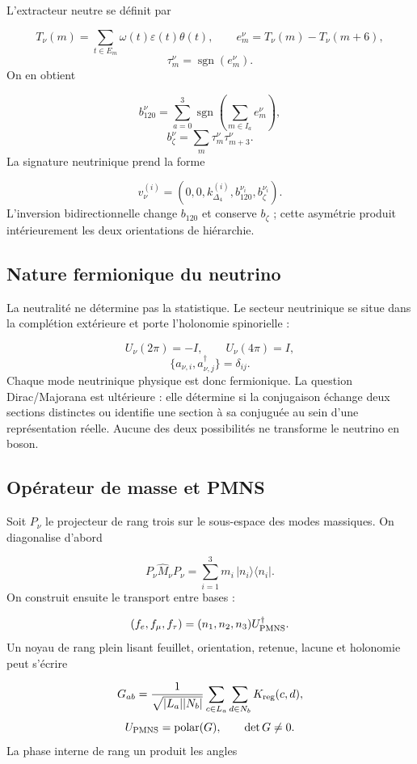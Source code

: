 L'extracteur neutre se définit par

\[
 T_\nu(m)=\sum_{t\in E_m}
 \omega(t)\varepsilon(t)\theta(t),
\qquad
 e_m^\nu=T_\nu(m)-T_\nu(m+6),
\]
\[
 \tau_m^\nu=\operatorname{sgn}(e_m^\nu).
\]
On en obtient

\[
 b_{120}^\nu
 =\sum_{a=0}^{3}
 \operatorname{sgn}\!\left(\sum_{m\in I_a}e_m^\nu\right),
\]
\[
 b_\zeta^\nu=\sum_m\tau_m^\nu\tau_{m+3}^\nu.
\]
La signature neutrinique prend la forme

\[
 v_\nu^{(i)}
 =(0,0,k_{\Delta_4}^{(i)},b_{120}^{\nu_i},b_\zeta^{\nu_i}).
\]
L'inversion bidirectionnelle change \(b_{120}\) et conserve \(b_\zeta\) ; cette asymétrie produit intérieurement les deux orientations de hiérarchie.

\subsection{Nature fermionique du neutrino}
La neutralité ne détermine pas la statistique. Le secteur neutrinique se situe dans la complétion extérieure et porte l'holonomie spinorielle :

\[
 U_\nu(2\pi)=-I,\qquad U_\nu(4\pi)=I,
\]
\[
 \{a_{\nu,i},a_{\nu,j}^\dagger\}=\delta_{ij}.
\]
Chaque mode neutrinique physique est donc fermionique. La question Dirac/Majorana est ultérieure : elle détermine si la conjugaison échange deux sections distinctes ou identifie une section à sa conjuguée au sein d'une représentation réelle. Aucune des deux possibilités ne transforme le neutrino en boson.

\subsection{Opérateur de masse et PMNS}
Soit \(P_\nu\) le projecteur de rang trois sur le sous-espace des modes massiques. On diagonalise d'abord

\[
 P_\nu\widehat M_\nu P_\nu
 =\sum_{i=1}^{3}m_i\,|n_i\rangle\langle n_i|.
\]
On construit ensuite le transport entre bases :

\[
 (f_e,f_\mu,f_\tau)
 =(n_1,n_2,n_3)U_{\rm PMNS}^\dagger.
\]
Un noyau de rang plein lisant feuillet, orientation, retenue, lacune et holonomie peut s'écrire

\[
 G_{ab}=
 \frac1{\sqrt{|L_a||N_b|}}
 \sum_{c\in L_a}\sum_{d\in N_b}K_{\rm reg}(c,d),
\]
\[
 U_{\rm PMNS}=\operatorname{polar}(G),
\qquad \det G\ne0.
\]
La phase interne de rang un produit les angles

